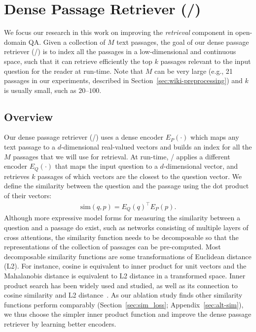 
\section{Dense Passage Retriever (\model/)}
\label{sec:retriever}


We focus our research in this work on improving the \emph{retrieval} component in open-domain QA.
Given a collection of $M$ text passages, the goal of our dense passage retriever (\model/) is to index all the passages in a low-dimensional and continuous space,
such that it can retrieve efficiently the top $k$ passages relevant to the input question for the reader at run-time.
Note that $M$ can be very large
(e.g., 21  passages in our experiments, described in Section~\ref{sec:wiki-preprocessing})
and $k$ is usually small, such as $20$--$100$.


\subsection{Overview}
Our dense passage retriever (\model/) uses a dense encoder $E_P(\cdot)$ which maps any text passage to a $d$-dimensional real-valued vectors and builds an index for all the $M$ passages that we will use for retrieval.
At run-time, \model/ applies a different encoder $E_Q(\cdot)$ that maps the input question to a $d$-dimensional vector, and retrieves $k$ passages
of which vectors are the closest to the question vector. We define the similarity between the question and the passage using the dot product of their vectors:
\begin{align}
    \mathrm{sim}(q, p) = E_Q(q)^{\intercal} E_P(p).
    \label{eq:sim}
\end{align}
Although more expressive model forms for measuring the similarity between a question and a passage do exist, such as networks consisting of multiple layers of cross attentions, the similarity function needs to be decomposable so that the representations of the collection of passages can be pre-computed.
Most decomposable similarity functions are some transformations of Euclidean distance (L2). For instance, cosine is equivalent to inner product for unit vectors and the Mahalanobis distance is equivalent to L2 distance in a transformed space.
Inner product search has been widely used and studied, as well as its connection to cosine similarity and L2 distance~\cite{mussmann2016learning,ram2012maximum}.
As our ablation study finds other similarity functions perform comparably (Section~\ref{sec:sim_loss}; Appendix~\ref{sec:alt-sim}), we thus choose the simpler inner product function and improve the dense passage retriever by learning better encoders.

